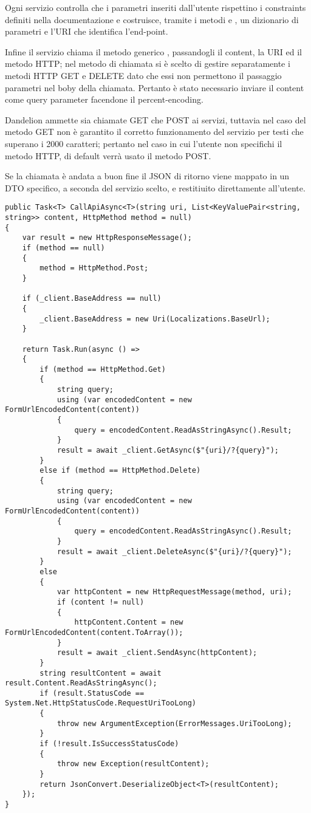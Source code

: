 Ogni servizio controlla che i parametri inseriti dall'utente rispettino i constraints definiti nella documentazione e costruisce, tramite i metodi  e  
, un dizionario di parametri e l'URI che identifica l'end-point. 

Infine il servizio chiama il metodo generico , passandogli il content, la URI ed il metodo HTTP; 
nel metodo di chiamata si è scelto di gestire separatamente i metodi HTTP GET e DELETE dato che essi non permettono il passaggio parametri nel boby 
della chiamata. Pertanto è stato necessario inviare il content come query parameter facendone il percent-encoding.

Dandelion ammette sia chiamate GET che POST ai servizi, tuttavia nel caso del metodo GET non è garantito il corretto 
funzionamento del servizio per testi che superano i 2000 caratteri; pertanto nel caso in cui l'utente non specifichi il metodo HTTP, di default verrà
usato il metodo POST.

Se la chiamata è andata a buon fine il JSON di ritorno viene mappato in un DTO specifico, a seconda del servizio scelto, e restitiuito direttamente all'utente.

\begin{lstlisting}[style=CSharpStyle, caption=Metodo generico del client per le chiamate HTTP]
public Task<T> CallApiAsync<T>(string uri, List<KeyValuePair<string, string>> content, HttpMethod method = null)
{
    var result = new HttpResponseMessage();
    if (method == null)
    {
        method = HttpMethod.Post;
    }

    if (_client.BaseAddress == null)
    {
        _client.BaseAddress = new Uri(Localizations.BaseUrl);
    }

    return Task.Run(async () =>
    {
        if (method == HttpMethod.Get)
        {
            string query;
            using (var encodedContent = new FormUrlEncodedContent(content))
            {
                query = encodedContent.ReadAsStringAsync().Result;
            }
            result = await _client.GetAsync($"{uri}/?{query}");
        }
        else if (method == HttpMethod.Delete)
        {
            string query;
            using (var encodedContent = new FormUrlEncodedContent(content))
            {
                query = encodedContent.ReadAsStringAsync().Result;
            }
            result = await _client.DeleteAsync($"{uri}/?{query}");
        }
        else
        {
            var httpContent = new HttpRequestMessage(method, uri);
            if (content != null)
            {
                httpContent.Content = new FormUrlEncodedContent(content.ToArray());
            }
            result = await _client.SendAsync(httpContent);
        }
        string resultContent = await result.Content.ReadAsStringAsync();
        if (result.StatusCode == System.Net.HttpStatusCode.RequestUriTooLong)
        {
            throw new ArgumentException(ErrorMessages.UriTooLong);
        }
        if (!result.IsSuccessStatusCode)
        {
            throw new Exception(resultContent); 
        }
        return JsonConvert.DeserializeObject<T>(resultContent);
    });
}
\end{lstlisting}

